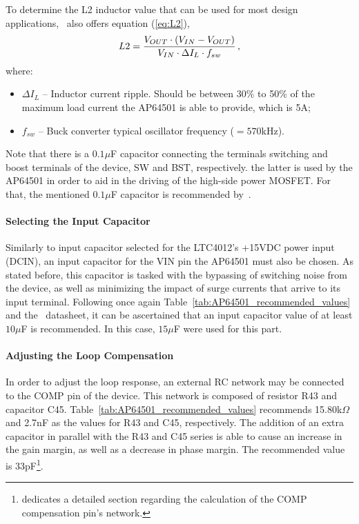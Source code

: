 To determine the L2 inductor value that can be used for most design applications,~\cite{AP64501} also offers equation (\ref{eq:L2}), 
\begin{equation}\label{eq:L2}
	L2 = \frac{V_{OUT} \cdot \left(V_{IN} - V_{OUT}\right)}{V_{IN} \cdot \Delta I_L \cdot f_{sw}}\,,\medskip
\end{equation}
where:
\begin{itemize}
	\item $\Delta I_L$ -- Inductor current ripple. Should be between 30\% to 50\% of the maximum load current the AP64501 is able to provide, which is 5A;
	\item $f_{sw}$ -- Buck converter typical oscillator frequency ($=570$kHz).
\end{itemize}

Note that there is a $0.1 \mu$F capacitor connecting the terminals switching and boost terminals of the device, SW and BST, respectively. the latter is used by the AP64501 in order to aid in the driving of the high-side power MOSFET. For that, the mentioned $0.1 \mu$F capacitor is recommended by~\cite{AP64501}.

\paragraph{Selecting the Input Capacitor}	Similarly to input capacitor selected for the LTC4012's +15VDC power input (DCIN), an input capacitor for the VIN pin the AP64501 must also be chosen. As stated before, this capacitor is tasked with the bypassing of switching noise from the device, as well as minimizing the impact of surge currents that arrive to its input terminal. Following once again Table~\ref{tab:AP64501_recommended_values} and the~\cite{AP64501} datasheet, it can be ascertained that an input capacitor value of at least $10 \mu$F is recommended. In this case, $15 \mu$F were used for this part.

\paragraph{Adjusting the Loop Compensation}	In order to adjust the loop response, an external RC network may be connected to the COMP pin of the device. This network is composed of resistor R43 and capacitor C45. Table~\ref{tab:AP64501_recommended_values} recommends 15.80k$\Omega$ and 2.7nF as the values for R43 and C45, respectively. The addition of an extra capacitor in parallel with the R43 and C45 series is able to cause an increase in the gain margin, as well as a decrease in phase margin. The recommended value is 33pF\footnote[12]{\cite{AP64501} dedicates a detailed section regarding the calculation of the COMP compensation pin's network.}.

